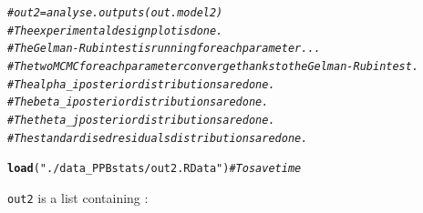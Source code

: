 \documentclass{article}\usepackage[]{graphicx}\usepackage[]{color}
\makeatletter
\newcommand{\hlstr}[1]{\textcolor[rgb]{0.192,0.494,0.8}{#1}}%
\newcommand{\hlcom}[1]{\textcolor[rgb]{0.678,0.584,0.686}{\textit{#1}}}%
\newcommand{\hlstd}[1]{\textcolor[rgb]{0.345,0.345,0.345}{#1}}%
\newcommand{\hlkwd}[1]{\textcolor[rgb]{0.737,0.353,0.396}{\textbf{#1}}}%
\newenvironment{kframe}{%
 \def\at@end@of@kframe{}%
 \ifinner\ifhmode%
  \def\at@end@of@kframe{\end{minipage}}%
  \begin{minipage}{\columnwidth}%
 \fi\fi%
 \def\FrameCommand##1{\hskip\@totalleftmargin \hskip-\fboxsep
 \colorbox{shadecolor}{##1}\hskip-\fboxsep
     \hskip-\linewidth \hskip-\@totalleftmargin \hskip\columnwidth}%
 \MakeFramed {\advance\hsize-\width
   \@totalleftmargin\z@ \linewidth\hsize
   \@setminipage}}%
 {\par\unskip\endMakeFramed%
 \at@end@of@kframe}
\newenvironment{knitrout}{}{} %
\makeatother
\begin{document}
\begin{knitrout}
\color{fgcolor}\begin{kframe}
\begin{alltt}
\hlcom{# out2 = analyse.outputs(out.model2)}
\hlcom{# The experimental design plot is done.}
\hlcom{# The Gelman-Rubin test is running for each parameter ...}
\hlcom{# The two MCMC for each parameter converge thanks to the Gelman-Rubin test.}
\hlcom{# The alpha_i posterior distributions are done.}
\hlcom{# The beta_i posterior distributions are done.}
\hlcom{# The theta_j posterior distributions are done.}
\hlcom{# The standardised residuals distributions are done.}

\hlkwd{load}\hlstd{(}\hlstr{"./data_PPBstats/out2.RData"}\hlstd{)} \hlcom{# To save time}
\end{alltt}
\end{kframe}
\end{knitrout}

\texttt{out2} is a list containing :
\end{document}
